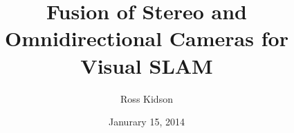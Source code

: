 \newcommand{\thedoctype}{Master's Thesis in Informatik\xspace}
\newcommand{\thetitle}{Fusion of Stereo and Omnidirectional Cameras for Visual SLAM\xspace}
\newcommand{\thetitleGer}{Visueller SLAM mittels Datenfusion aus Stereo- und omnidirektionalen Kameras\xspace}
\newcommand{\theauthor}{Ross Kidson\xspace}
\newcommand{\theplace}{Palo Alto\xspace}
\newcommand{\thedate}{Janurary 15, 2014\xspace}
\newcommand{\thesupervisor}{Prof. Dr. Daniel Cremers}
\newcommand{\theadvisor}{Dr. Juergen Sturm}

\date{\thedate}
\title{\thetitle}
\author{\theauthor}

\newcommand{\footertext}{}
